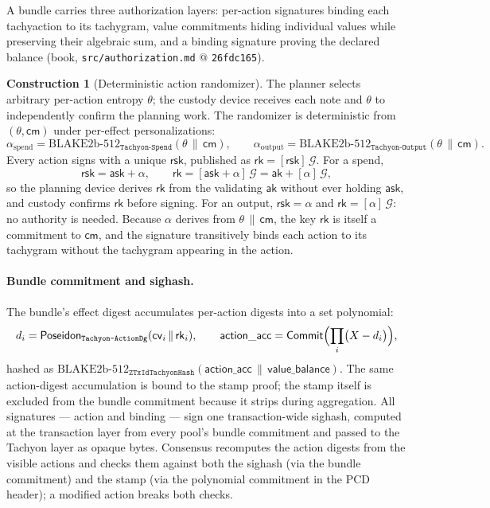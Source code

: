 \documentclass[11pt,a4paper]{article}
\theoremstyle{definition}
\newtheorem{construction}[theorem]{Construction}
\newcommand{\Comm}{\mathsf{Commit}}
\newcommand{\cmsym}{\mathsf{cm}}
\newcommand{\cvsym}{\mathsf{cv}}
\newcommand{\rk}{\mathsf{rk}}
\newcommand{\ask}{\ensuremath{\mathsf{ask}}}
\newcommand{\aksym}{\ensuremath{\mathsf{ak}}}
\newcommand{\rsk}{\ensuremath{\mathsf{rsk}}}
\begin{document}
A bundle carries three authorization layers: per-action signatures binding
each tachyaction to its tachygram, value commitments hiding individual
values while preserving their algebraic sum, and a binding signature
proving the declared balance (book, \texttt{src/authorization.md} @
\texttt{26fdc165}).

\begin{construction}[Deterministic action randomizer]
\label{def:tachyon-design-alpha}
The planner selects arbitrary per-action entropy $\theta$; the custody
device receives each note and $\theta$ to independently confirm the
planning work. The randomizer is deterministic from $(\theta, \cmsym)$
under per-effect personalizations:
\[
\alpha_{\mathrm{spend}} =
  \text{BLAKE2b-512}_{\texttt{Tachyon-Spend}}(\theta \,\|\, \cmsym),
\qquad
\alpha_{\mathrm{output}} =
  \text{BLAKE2b-512}_{\texttt{Tachyon-Output}}(\theta \,\|\, \cmsym).
\]
Every action signs with a unique $\rsk$, published as
$\rk = [\rsk]\,\mathcal{G}$. For a spend,
\[
\rsk = \ask + \alpha, \qquad
\rk = [\ask + \alpha]\,\mathcal{G} = \aksym + [\alpha]\,\mathcal{G},
\]
so the planning device derives $\rk$ from the validating $\aksym$ without
ever holding $\ask$, and custody confirms $\rk$ before signing. For an
output, $\rsk = \alpha$ and $\rk = [\alpha]\,\mathcal{G}$: no authority is
needed. Because $\alpha$ derives from $\theta \,\|\, \cmsym$, the key $\rk$
is itself a commitment to $\cmsym$, and the signature transitively binds
each action to its tachygram without the tachygram appearing in the action.
\end{construction}

\paragraph{Bundle commitment and sighash.} The bundle's effect digest
accumulates per-action digests into a set polynomial:
\[
d_i = \mathsf{Poseidon}_{\texttt{Tachyon-ActionDg}}
  (\cvsym_i \,\|\, \rk_i), \qquad
\mathsf{action\_acc} = \Comm\Bigl(\prod_i \bigl(X - d_i\bigr)\Bigr),
\]
hashed as $\text{BLAKE2b-512}_{\texttt{ZTxIdTachyonHash}}
(\mathsf{action\_acc} \,\|\, \mathsf{value\_balance})$. The same
action-digest accumulation is bound to the stamp proof; the stamp itself
is excluded from the bundle commitment because it strips during
aggregation. All signatures --- action and binding --- sign one
transaction-wide sighash, computed at the transaction layer from every
pool's bundle commitment and passed to the Tachyon layer as opaque bytes.
Consensus recomputes the action digests from the visible actions and
checks them against both the sighash (via the bundle commitment) and the
stamp (via the polynomial commitment in the PCD header); a modified action
breaks both checks.
\end{document}
